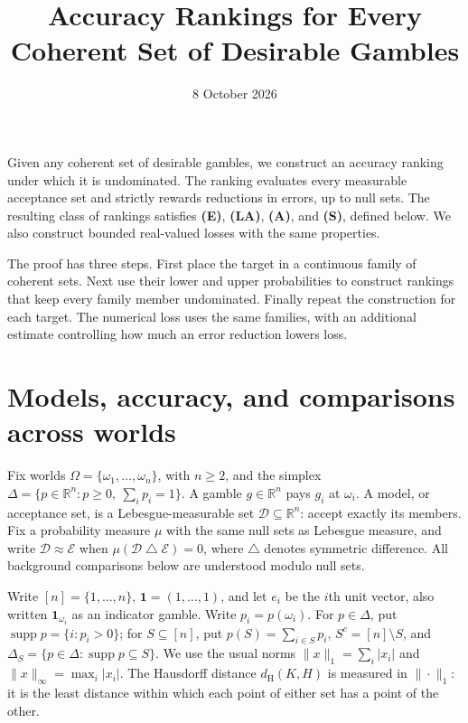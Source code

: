 \documentclass[11pt]{article}
\title{Accuracy Rankings for Every Coherent Set of Desirable Gambles}
\author{}
\date{8 October 2026}
\theoremstyle{remark}
\newcommand{\R}{\mathbb R}
\newcommand{\one}{\mathbf 1}
\newcommand{\supp}{\operatorname{supp}}
\newcommand{\sd}{\mathbin{\triangle}}
\newcommand{\dH}{d_{\mathrm H}}
\newcommand{\Dscr}{\mathcal D}
\newcommand{\Escr}{\mathcal E}
\begin{document}
\maketitle

\noindent
Given any coherent set of desirable gambles, we construct an accuracy ranking
under which it is undominated. The ranking evaluates every measurable
acceptance set and strictly rewards reductions in errors, up to null sets.
The resulting class of rankings satisfies \textbf{(E)}, \textbf{(LA)},
\textbf{(A)}, and \textbf{(S)}, defined below. We also construct bounded
real-valued losses with the same properties.

The proof has three steps. First place the target in a continuous family of
coherent sets. Next use their lower and upper probabilities to construct
rankings that keep every family member undominated. Finally repeat the
construction for each target. The numerical loss uses the same families,
with an additional estimate controlling how much an error reduction lowers loss.

\section{Models, accuracy, and comparisons across worlds}

Fix worlds $\Omega=\{\omega_1,\dots,\omega_n\}$, with $n\ge2$, and the simplex
$\Delta=\{p\in\R^n:p\ge0,\ \sum_i p_i=1\}$.
A gamble $g\in\R^n$ pays $g_i$ at $\omega_i$. A model, or acceptance set,
is a Lebesgue-measurable set $\Dscr\subseteq\R^n$: accept exactly its members. Fix a probability measure
$\mu$ with the same null sets as Lebesgue measure, and write
$\Dscr\approx \Escr$ when $\mu(\Dscr\sd \Escr)=0$, where $\sd$ denotes symmetric difference.
All background comparisons below are understood modulo null sets.

Write $[n]=\{1,\dots,n\}$, $\one=(1,\dots,1)$, and let $e_i$ be the $i$th
unit vector, also written $\one_{\omega_i}$ as an indicator gamble.
Write $p_i=p(\omega_i)$. For $p\in\Delta$, put $\supp p=\{i:p_i>0\}$; for
$S\subseteq[n]$, put $p(S)=\sum_{i\in S}p_i$,
$S^c=[n]\setminus S$, and $\Delta_S=\{p\in\Delta:\supp p\subseteq S\}$.
We use the usual norms $\|x\|_1=\sum_i|x_i|$ and
$\|x\|_\infty=\max_i|x_i|$. The Hausdorff distance $\dH(K,H)$ is measured in
$\|\cdot\|_1$: it is the least distance within which each point of either set
has a point of the other.
\end{document}
